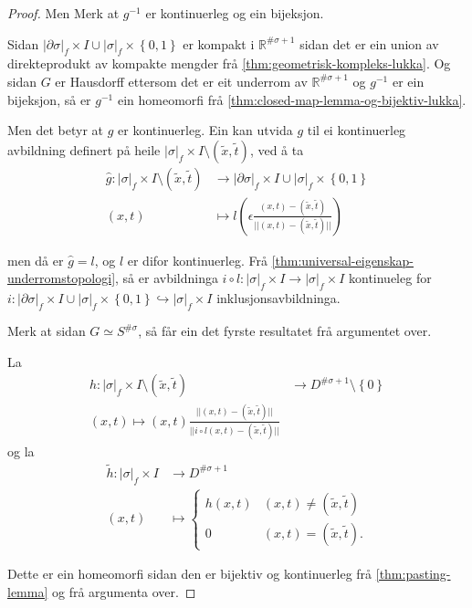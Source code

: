 \documentclass[a4paper, 12pt, norsk]{article}
\theoremstyle{plain}
\theoremstyle{definition}
\newcommand{\Rb}{\mathbb{R}}
\newcommand{\union}{ \mathop{\cup}\limits }
\newcommand{\gr}[1]{ \lvert #1 \rvert } %
\newcommand{\set}[1]{ \left\{ #1 \right\} } %
\newcommand{\tuple}[1]{ \left( #1 \right) } %
\begin{document}
\begin{proof}
	Men Merk at  \( g^{-1} \) er kontinuerleg og ein bijeksjon.
	
	Sidan \( \gr{\partial\sigma}_f \times I \union \gr{\sigma}_f \times \set{0, 1} \) er kompakt i \( \Rb^{\#\sigma+1} \) sidan det er ein union av direkteprodukt av kompakte mengder frå \autoref{thm:geometrisk-kompleks-lukka}. Og sidan \( G \) er Hausdorff ettersom det er eit underrom av \( \Rb^{\#\sigma+1} \) og \( g^{-1} \) er ein bijeksjon, så er \( g^{-1} \) ein homeomorfi frå \autoref{thm:closed-map-lemma-og-bijektiv-lukka}.
	
	Men det betyr at \( g \) er kontinuerleg. Ein kan utvida \( g \) til ei kontinuerleg avbildning definert på heile \( \gr{\sigma}_f \times I \setminus \tuple{\tilde{x}, \tilde{t}} \), ved å ta
	\begin{align*}
		\hat{g} : \gr{\sigma}_f \times I \setminus \tuple{\tilde{x}, \tilde{t}} &\to \gr{\partial\sigma}_f \times I \union \gr{\sigma}_f \times \set{0, 1} \\
		(x,t) &\mapsto l\tuple{\epsilon\frac{(x,t)-\tuple{\tilde{x}, \tilde{t}}}{||(x,t) - \tuple{\tilde{x}, \tilde{t}}||}}
	\end{align*}

	men då er \( \hat{g} = l \), og \( l \) er difor kontinuerleg. Frå \autoref{thm:universal-eigenskap-underromstopologi}, så er avbildninga \( i \circ l : \gr{\sigma}_f \times I \to \gr{\sigma}_f \times I \) kontinueleg for \( i: \gr{\partial\sigma}_f \times I \union \gr{\sigma}_f \times \set{0, 1} \hookrightarrow \gr{\sigma}_f \times I \) inklusjonsavbildninga.
	
	Merk at sidan \( G \simeq S^{\#\sigma} \), så får ein det fyrste resultatet frå argumentet over.

	La
	\begin{align*}
		h: \gr{\sigma}_f \times I \setminus \tuple{\tilde{x}, \tilde{t}} &\to D^{\#\sigma+1} \setminus \set{0} \\
		(x, t) \mapsto \tuple{x, t}\frac{||(x,t) - (\tilde{x}, \tilde{t})||}{||i\circ l(x,t)-(\tilde{x}, \tilde{t})||}
	\end{align*}
	og la
	\begin{align*}
		\tilde{h}: \gr{\sigma}_f \times I &\to D^{\#\sigma+1} \\
		(x,t) &\mapsto
		\begin{cases}
			h(x,t) & (x, t) \neq (\tilde{x}, \tilde{t}) \\
			0 & (x, t) = (\tilde{x}, \tilde{t}).
		\end{cases}
	\end{align*}

	Dette er ein homeomorfi sidan den er bijektiv og kontinuerleg frå \autoref{thm:pasting-lemma} og frå argumenta over.
\end{proof}
\end{document}
